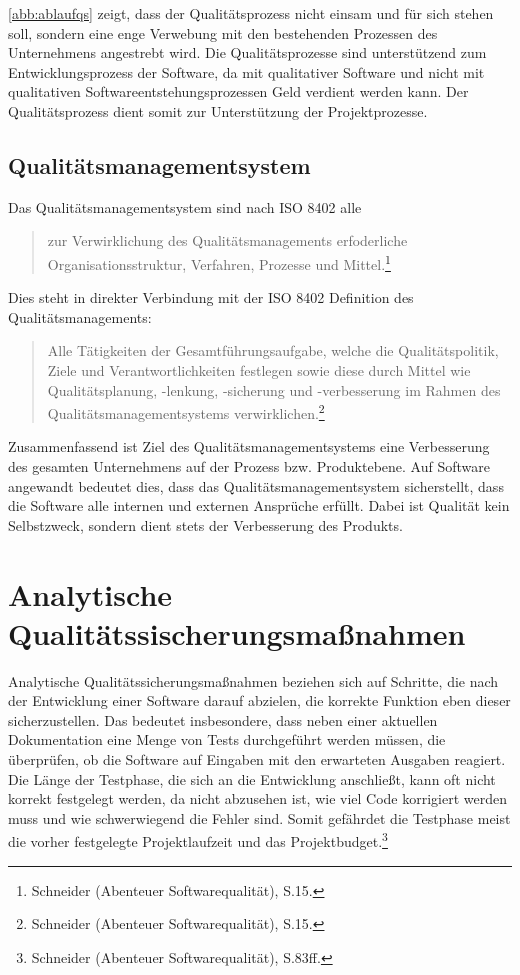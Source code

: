             \autoref{abb:ablaufqs} zeigt, dass der Qualitätsprozess nicht einsam und für sich stehen soll, sondern eine enge Verwebung mit den bestehenden Prozessen des Unternehmens angestrebt wird. Die Qualitätsprozesse sind unterstützend zum Entwicklungsprozess der Software, da mit qualitativer Software und nicht mit qualitativen Softwareentstehungsprozessen Geld verdient werden kann. Der Qualitätsprozess dient somit zur Unterstützung der Projektprozesse.

        \subsection{Qualitätsmanagementsystem}

            Das Qualitätsmanagementsystem sind nach ISO 8402 alle
            \begin{quote}
                zur Verwirklichung des Qualitätsmanagements erfoderliche Organisationsstruktur, Verfahren, Prozesse und Mittel.\footnote{Schneider (Abenteuer Softwarequalität), S.15.}
            \end{quote}
            Dies steht in direkter Verbindung mit der ISO 8402 Definition des Qualitätsmanagements:
            \begin{quote}
                Alle Tätigkeiten der Gesamtführungsaufgabe, welche die Qualitätspolitik, Ziele und Verantwortlichkeiten festlegen sowie diese durch Mittel wie Qualitätsplanung, -lenkung, -sicherung und -verbesserung im Rahmen des Qualitätsmanagementsystems verwirklichen.\footnote{Schneider (Abenteuer Softwarequalität), S.15.}
            \end{quote}

            Zusammenfassend ist Ziel des Qualitätsmanagementsystems eine Verbesserung des gesamten Unternehmens auf der Prozess bzw. Produktebene. Auf Software angewandt bedeutet dies, dass das Qualitätsmanagementsystem sicherstellt, dass die Software alle internen und externen Ansprüche erfüllt. Dabei ist Qualität kein Selbstzweck, sondern dient stets der Verbesserung des Produkts.

%
%
    \section{Analytische Qualitätssischerungsmaßnahmen}
    \label{subsec:analytischeqs}

        Analytische Qualitätssicherungsmaßnahmen beziehen sich auf Schritte, die nach der Entwicklung einer Software darauf abzielen, die korrekte Funktion eben dieser sicherzustellen. Das bedeutet insbesondere, dass neben einer aktuellen Dokumentation eine Menge von Tests durchgeführt werden müssen, die überprüfen, ob die Software auf Eingaben mit den erwarteten Ausgaben reagiert. Die Länge der Testphase, die sich an die Entwicklung anschließt, kann oft nicht korrekt festgelegt werden, da nicht abzusehen ist, wie viel Code korrigiert werden muss und wie schwerwiegend die Fehler sind. Somit gefährdet die Testphase meist die vorher festgelegte Projektlaufzeit und das Projektbudget.\footnote{Schneider (Abenteuer Softwarequalität), S.83ff.}

